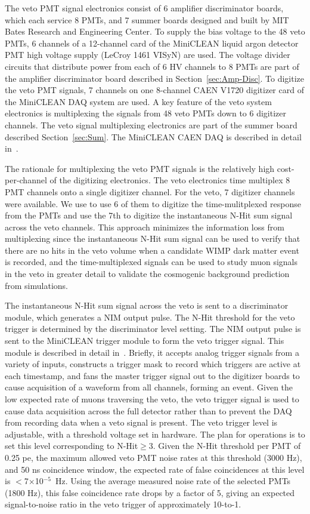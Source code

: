 \documentclass[review,number,sort&compress]{elsarticle}
\begin{document}
The veto PMT signal electronics consist of 6 amplifier discriminator
boards, which each service 8 PMTs, and 7 summer boards designed and
built by MIT Bates Research and Engineering Center.  To supply the
bias voltage to the 48 veto PMTs, 6 channels of a 12-channel card of
the MiniCLEAN liquid argon detector PMT high voltage supply (LeCroy
1461 VISyN) are used. The voltage divider circuits that distribute
power from each of 6 HV channels to 8 PMTs are part of the amplifier
discriminator board described in Section~\ref{sec:Amp-Disc}.  To
digitize the veto PMT signals, 7 channels on one 8-channel CAEN V1720
digitizer card of the MiniCLEAN DAQ system are used.  A key feature of
the veto system electronics is multiplexing the signals from 48 veto
PMTs down to 6 digitizer channels.  The veto signal multiplexing
electronics are part of the summer board described
Section~\ref{sec:Sum}. The MiniCLEAN CAEN DAQ is described in detail
in~\cite{ref:gastler_thesis}.

The rationale for multiplexing the veto PMT signals is the relatively
high cost-per-channel of the digitizing electronics.  The veto
electronics time multiplex 8 PMT channels onto a single digitizer
channel. For the veto, 7 digitizer channels were available. We use
to use 6 of them to digitize the time-mulitplexed response from the
PMTs and use the 7th to digitize the instantaneous N-Hit sum signal
across the veto channels.  This approach minimizes the information
loss from multiplexing since the instantaneous N-Hit sum signal can be
used to verify that there are no hits in the veto volume when a
candidate WIMP dark matter event is recorded, and the time-multiplexed
signals can be used to study muon signals in the veto in greater
detail to validate the cosmogenic background prediction from simulations.

The instantaneous N-Hit sum signal across the veto is sent to a
discriminator module, which generates a NIM output pulse.  The N-Hit
threshold for the veto trigger is determined by the discriminator
level setting.  The NIM output pulse is sent to the MiniCLEAN trigger
module to form the veto trigger signal.  This module is described in
detail in~\cite{ref:gastler_thesis}.  Briefly, it accepts analog
trigger signals from a variety of inputs, constructs a trigger mask to
record which triggers are active at each timestamp, and fans the master
trigger signal out to the digitizer boards to cause acquisition of a
waveform from all channels, forming an event.  Given the low expected
rate of muons traversing the veto, the veto trigger signal is used to
cause data acquisition across the full detector rather than to prevent
the DAQ from recording data when a veto signal is present.  The veto
trigger level is adjustable, with a threshold voltage set in hardware.
The plan for operations is to set this level corresponding to
N-Hit$\ge$3.  Given the N-Hit threshold per PMT of 0.25 pe, the
maximum allowed veto PMT noise rates at this threshold (3000 Hz), and
50 ns coincidence window, the expected rate of false coincidences at
this level is $<$7$\times$10$^{-5}$~Hz.  Using the average measured
noise rate of the selected PMTs (1800 Hz), this false coincidence rate
drops by a factor of 5, giving an expected signal-to-noise ratio in
the veto trigger of approximately 10-to-1.
\end{document}
